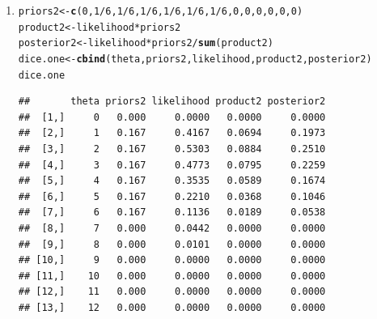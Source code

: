 \documentclass[12pt]{article}\usepackage[]{graphicx}\usepackage[]{color}
\makeatletter
\newcommand{\hlnum}[1]{\textcolor[rgb]{0.686,0.059,0.569}{#1}}%
\newcommand{\hlopt}[1]{\textcolor[rgb]{0,0,0}{#1}}%
\newcommand{\hlstd}[1]{\textcolor[rgb]{0.345,0.345,0.345}{#1}}%
\newcommand{\hlkwb}[1]{\textcolor[rgb]{0.69,0.353,0.396}{#1}}%
\newcommand{\hlkwd}[1]{\textcolor[rgb]{0.737,0.353,0.396}{\textbf{#1}}}%
\newenvironment{kframe}{%
 \def\at@end@of@kframe{}%
 \ifinner\ifhmode%
  \def\at@end@of@kframe{\end{minipage}}%
  \begin{minipage}{\columnwidth}%
 \fi\fi%
 \def\FrameCommand##1{\hskip\@totalleftmargin \hskip-\fboxsep
 \colorbox{shadecolor}{##1}\hskip-\fboxsep
     \hskip-\linewidth \hskip-\@totalleftmargin \hskip\columnwidth}%
 \MakeFramed {\advance\hsize-\width
   \@totalleftmargin\z@ \linewidth\hsize
   \@setminipage}}%
 {\par\unskip\endMakeFramed%
 \at@end@of@kframe}
\newenvironment{knitrout}{}{} %
\makeatother
\begin{document}
\begin{doublespacing}
\begin{enumerate}
\begin{enumerate}
\item 
\begin{knitrout}\footnotesize
{}\color{fgcolor}\begin{kframe}
\begin{alltt}
\hlstd{priors2} \hlkwb{<-} \hlkwd{c}\hlstd{(}\hlnum{0}\hlstd{,} \hlnum{1}\hlopt{/}\hlnum{6}\hlstd{,} \hlnum{1}\hlopt{/}\hlnum{6}\hlstd{,} \hlnum{1}\hlopt{/}\hlnum{6}\hlstd{,} \hlnum{1}\hlopt{/}\hlnum{6}\hlstd{,} \hlnum{1}\hlopt{/}\hlnum{6}\hlstd{,} \hlnum{1}\hlopt{/}\hlnum{6}\hlstd{,} \hlnum{0}\hlstd{,} \hlnum{0}\hlstd{,} \hlnum{0}\hlstd{,} \hlnum{0}\hlstd{,} \hlnum{0}\hlstd{,} \hlnum{0}\hlstd{)}
\hlstd{product2} \hlkwb{<-} \hlstd{likelihood}\hlopt{*}\hlstd{priors2}
\hlstd{posterior2} \hlkwb{<-} \hlstd{likelihood}\hlopt{*}\hlstd{priors2}\hlopt{/}\hlkwd{sum}\hlstd{(product2)}
\hlstd{dice.one} \hlkwb{<-} \hlkwd{cbind}\hlstd{(theta, priors2, likelihood, product2, posterior2)}
\hlstd{dice.one}
\end{alltt}
\begin{verbatim}
##       theta priors2 likelihood product2 posterior2
##  [1,]     0   0.000     0.0000   0.0000     0.0000
##  [2,]     1   0.167     0.4167   0.0694     0.1973
##  [3,]     2   0.167     0.5303   0.0884     0.2510
##  [4,]     3   0.167     0.4773   0.0795     0.2259
##  [5,]     4   0.167     0.3535   0.0589     0.1674
##  [6,]     5   0.167     0.2210   0.0368     0.1046
##  [7,]     6   0.167     0.1136   0.0189     0.0538
##  [8,]     7   0.000     0.0442   0.0000     0.0000
##  [9,]     8   0.000     0.0101   0.0000     0.0000
## [10,]     9   0.000     0.0000   0.0000     0.0000
## [11,]    10   0.000     0.0000   0.0000     0.0000
## [12,]    11   0.000     0.0000   0.0000     0.0000
## [13,]    12   0.000     0.0000   0.0000     0.0000
\end{verbatim}
\end{kframe}
\end{knitrout}


\end{enumerate}
\end{enumerate}
\end{doublespacing}
\end{document}
